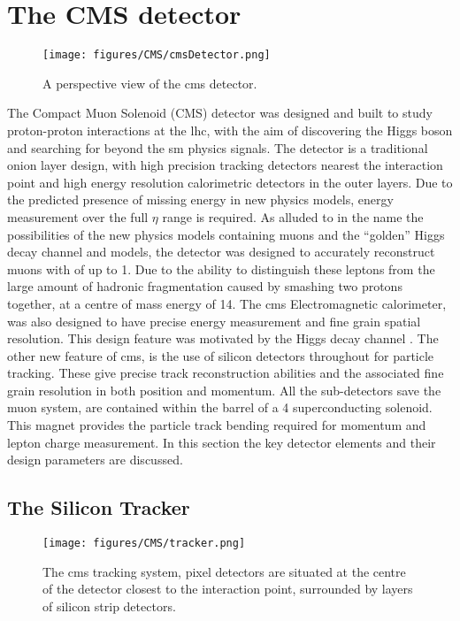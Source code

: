 \chapter{The CMS detector} %
\label{cha:the_cms_detector}
\begin{figure}[htbp]
  \centering
    \texttt{[image: figures/CMS/cmsDetector.png]}
  \caption{A perspective view of the \ac{cms} detector.}
  \label{fig:figures_CMS_cmsDetector}
\end{figure}

The Compact Muon Solenoid (CMS) detector was designed and built to study proton-proton interactions at the \ac{lhc}, with the aim of discovering the Higgs boson and searching for beyond the \ac{sm} physics signals. The detector is a traditional onion layer design, with high precision tracking detectors nearest the interaction point and high energy resolution calorimetric detectors in the outer layers. Due to the predicted presence of missing energy \MET in new
physics models, energy measurement over the full $\eta$ range is required. As
alluded to in the name the possibilities of the new physics models containing
muons and the ``golden'' Higgs decay channel
\HepProcess{\PH\to\PZ\PZ\to\Pmu\Pmu\Pmu\Pmu} and \PZprime models, the detector
was designed to accurately reconstruct muons with \PT of up to \unit{1}{\TeV}.
Due to the ability to distinguish these
leptons from the large amount of hadronic fragmentation caused by smashing two
protons together, at a centre of mass energy of \unit{14}{\TeV}. The \ac{cms}
Electromagnetic calorimeter, was also designed to have precise energy
measurement and fine grain spatial resolution. This design feature was
motivated by the Higgs decay channel \HepProcess{\PH\to\Pphoton\Pphoton}. The
other new feature of \ac{cms}, is the use of silicon detectors throughout for
particle tracking. These give precise track reconstruction abilities and the
associated fine grain resolution in both position and momentum. All the
sub-detectors save the muon system, are contained within the barrel of a
\unit{4}{\tesla} superconducting solenoid. This magnet provides the particle
track bending required for momentum and lepton charge measurement. In this
section the key detector elements and their design parameters are discussed.

\section{The Silicon Tracker} %
\label{sec:the_silicon_tracker}
\begin{figure}[htbp]
  \centering
    \texttt{[image: figures/CMS/tracker.png]}
  \caption{The \ac{cms} tracking system, pixel detectors are situated at the
  centre of the detector closest to the interaction point, surrounded by layers
  of silicon strip detectors.}
  \label{fig:figures_CMS_tracker}
\end{figure}

